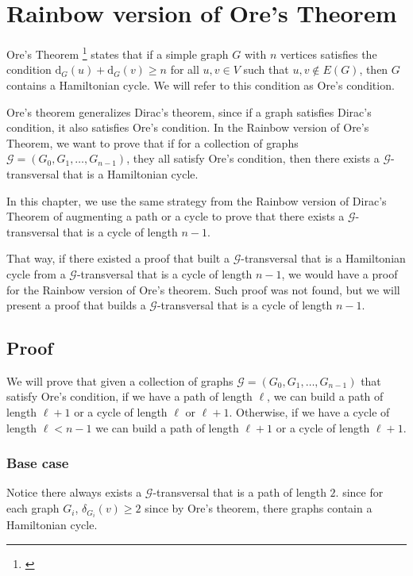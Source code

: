 
\chapter{Rainbow version of Ore's Theorem}
\label{chap:ore}

Ore's Theorem \footnote{\cite{Ore_1960}} states that if a simple graph $G$ with $n$ vertices satisfies the condition
$\text{d}_G(u) + \text{d}_G(v) \geq n$ for all $u, v \in V$ such that ${u, v} \not\in E(G)$, then $G$ contains a Hamiltonian cycle.
We will refer to this condition as Ore's condition.

Ore's theorem generalizes Dirac's theorem, since if a graph satisfies Dirac's condition, it also satisfies Ore's condition.
In the Rainbow version of Ore's Theorem, we want to prove that if for a collection of graphs $\mathcal{G} = (G_0, G_1, \ldots, G_{n-1})$, they all satisfy Ore's condition,
then there exists a $\mathcal{G}$-transversal that is a Hamiltonian cycle.

In this chapter, we use the same strategy from the 
Rainbow version of Dirac's Theorem of augmenting a path or a cycle   
to prove that there exists a $\mathcal{G}$-transversal that is a cycle of length $n - 1$.

That way, if there existed a proof that built a 
$\mathcal{G}$-transversal that is a Hamiltonian cycle from a
$\mathcal{G}$-transversal that is a cycle of length $n - 1$, 
we would have a proof for the Rainbow version of Ore's theorem.
Such proof was not found,
but we will present a proof that builds a $\mathcal{G}$-transversal 
that is a cycle of length $n - 1$.


\section{Proof}

We will prove that given a collection of graphs $\mathcal{G} = (G_0, G_1, \ldots, G_{n-1})$ 
that satisfy Ore's condition,
if we have a path of length $\ell$, we can build a path of length $\ell + 1$  or 
a cycle of length $\ell$ or $\ell + 1$.
Otherwise, if we have a cycle of length $\ell < n - 1$ 
we can build a path of length $\ell + 1$ or a cycle of length $\ell + 1$.

\subsection{Base case}

Notice there always exists a $\mathcal{G}$-transversal that is a path of length $2$.
since for each graph $G_i$, $\delta_{G_i}(v) \geq 2$ since by Ore's theorem,
there graphs contain a Hamiltonian cycle. 

